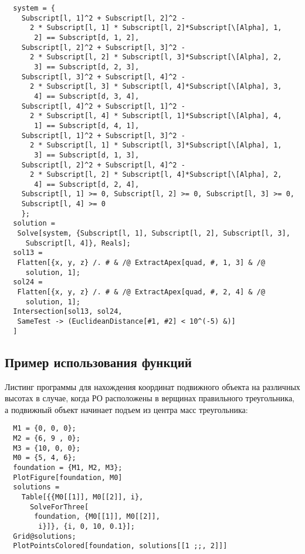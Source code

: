 \documentclass[../main.tex]{subfiles}
\begin{document}
\begin{lstlisting}
  system = {
    Subscript[l, 1]^2 + Subscript[l, 2]^2 -
      2 * Subscript[l, 1] * Subscript[l, 2]*Subscript[\[Alpha], 1,
       2] == Subscript[d, 1, 2],
    Subscript[l, 2]^2 + Subscript[l, 3]^2 -
      2 * Subscript[l, 2] * Subscript[l, 3]*Subscript[\[Alpha], 2,
       3] == Subscript[d, 2, 3],
    Subscript[l, 3]^2 + Subscript[l, 4]^2 -
      2 * Subscript[l, 3] * Subscript[l, 4]*Subscript[\[Alpha], 3,
       4] == Subscript[d, 3, 4],
    Subscript[l, 4]^2 + Subscript[l, 1]^2 -
      2 * Subscript[l, 4] * Subscript[l, 1]*Subscript[\[Alpha], 4,
       1] == Subscript[d, 4, 1],
    Subscript[l, 1]^2 + Subscript[l, 3]^2 -
      2 * Subscript[l, 1] * Subscript[l, 3]*Subscript[\[Alpha], 1,
       3] == Subscript[d, 1, 3],
    Subscript[l, 2]^2 + Subscript[l, 4]^2 -
      2 * Subscript[l, 2] * Subscript[l, 4]*Subscript[\[Alpha], 2,
       4] == Subscript[d, 2, 4],
    Subscript[l, 1] >= 0, Subscript[l, 2] >= 0, Subscript[l, 3] >= 0,
    Subscript[l, 4] >= 0
    };
  solution =
   Solve[system, {Subscript[l, 1], Subscript[l, 2], Subscript[l, 3],
     Subscript[l, 4]}, Reals];
  sol13 =
   Flatten[{x, y, z} /. # & /@ ExtractApex[quad, #, 1, 3] & /@
     solution, 1];
  sol24 =
   Flatten[{x, y, z} /. # & /@ ExtractApex[quad, #, 2, 4] & /@
     solution, 1];
  Intersection[sol13, sol24,
   SameTest -> (EuclideanDistance[#1, #2] < 10^(-5) &)]
  ]
\end{lstlisting}

\subsection{Пример использования функций}
Листинг программы для нахождения координат подвижного объекта на различных высотах в случае, когда
РО расположены в верщинах правильного треугольника, а подвижный объект начинает
подъем из центра масс треугольника:
\begin{lstlisting}
  M1 = {0, 0, 0};
  M2 = {6, 9 , 0};
  M3 = {10, 0, 0};
  M0 = {5, 4, 6};
  foundation = {M1, M2, M3};
  PlotFigure[foundation, M0]
  solutions =
    Table[{{M0[[1]], M0[[2]], i},
      SolveForThree[
       foundation, {M0[[1]], M0[[2]],
        i}]}, {i, 0, 10, 0.1}];
  Grid@solutions;
  PlotPointsColored[foundation, solutions[[1 ;;, 2]]]
\end{lstlisting}
\end{document}
